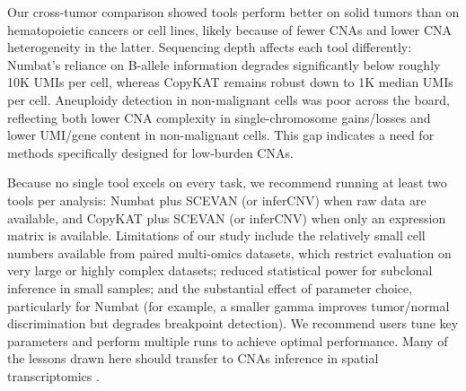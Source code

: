 \documentclass[11pt]{article}
\begin{document}
Our cross-tumor comparison showed tools perform better on solid tumors than on hematopoietic cancers or cell lines, likely because of fewer CNAs and lower CNA heterogeneity in the latter. Sequencing depth affects each tool differently: Numbat's reliance on B-allele information degrades significantly below roughly 10K UMIs per cell, whereas CopyKAT remains robust down to 1K median UMIs per cell. Aneuploidy detection in non-malignant cells was poor across the board, reflecting both lower CNA complexity in single-chromosome gains/losses and lower UMI/gene content in non-malignant cells. This gap indicates a need for methods specifically designed for low-burden CNAs.

Because no single tool excels on every task, we recommend running at least two tools per analysis: Numbat plus SCEVAN (or inferCNV) when raw data are available, and CopyKAT plus SCEVAN (or inferCNV) when only an expression matrix is available. Limitations of our study include the relatively small cell numbers available from paired multi-omics datasets, which restrict evaluation on very large or highly complex datasets; reduced statistical power for subclonal inference in small samples; and the substantial effect of parameter choice, particularly for Numbat (for example, a smaller gamma improves tumor/normal discrimination but degrades breakpoint detection). We recommend users tune key parameters and perform multiple runs to achieve optimal performance. Many of the lessons drawn here should transfer to CNAs inference in spatial transcriptomics \citep{erickson2022spatial}.



\end{document}

